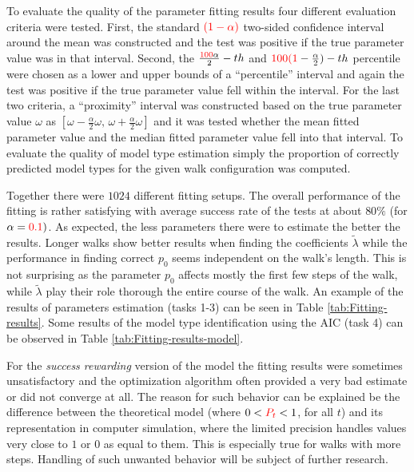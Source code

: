 \documentclass{amsart}
\theoremstyle{definition}
\theoremstyle{plain}
\theoremstyle{plain}
\theoremstyle{plain}
\numberwithin{equation}{section}
\begin{document}
    To evaluate the quality of the parameter fitting results four different {\color{red}evaluation} criteria were tested. First, the standard $\color{red}(1-\alpha)$ two-sided confidence interval around the mean was constructed and the test was positive if the true parameter value was in that interval. Second, the $\frac{{\color{red}100}\alpha}{2}-th$ and ${\color{red}100(1}-\frac{\alpha}{2})-th$ percentile were chosen as a lower and upper bounds of a ``percentile'' interval and again the test was positive if the true parameter value fell within the interval. {\color{red}For the last two criteria}, a ``proximity'' interval was constructed based on the true parameter value {\color{red}$\omega$ as $[\omega-\frac{\alpha}{2}\omega,\,\omega+\frac{\alpha}{2}\omega]$} and it was tested whether {\color{yellow}the mean} fitted parameter value and {\color{yellow} the median} fitted parameter value fell into that interval. To evaluate the quality of model type estimation simply the proportion of correctly predicted model types for the given walk configuration was computed.

    Together there were $1024$ different fitting setups. The overall performance of the fitting is rather satisfying with average success rate of the tests at about $80\%$ (for $\alpha={\color{red}0.1})$. As expected, the less parameters there were to estimate the better the results. Longer walks show better results when finding the coefficients $\tilde{\lambda}$ while the performance in finding correct $p_0$ seems independent on the walk's length. This is not surprising as the parameter $p_0$ affects mostly the first few steps of the walk, while $\tilde{\lambda}$ play their role thorough the entire course of the walk. An example of the results of parameters estimation (tasks 1-3) can be seen in Table \ref{tab:Fitting-results}. Some results of the model type identification using the AIC (task 4) can be observed in Table \ref{tab:Fitting-results-model}.

    For the \emph{success rewarding} version of the model the fitting results were sometimes unsatisfactory and the optimization algorithm often provided a very bad estimate or did not converge at all. The reason for such behavior can be explained be the difference between the theoretical model (where $0<{\color{red}P_t}<1$, {\color{red}for all} $t$) and its representation in computer simulation, where the limited precision handles values very close to $1$ or $0$ as equal to them. This is especially true for walks with more steps. Handling of such unwanted behavior will be subject of further research.
\end{document}
